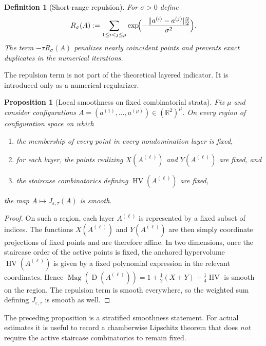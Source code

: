\documentclass{article}
\newtheorem{definition}{Definition}
\newtheorem{proposition}{Proposition}
\newcommand{\Mag}{\operatorname{Mag}}
\newcommand{\HV}{\operatorname{HV}}
\newcommand{\R}{\mathbb{R}}
\newcommand{\front}[1]{A^{(#1)}}
\newcommand{\Dom}{\operatorname{D}}
\begin{document}
\begin{definition}[Short-range repulsion]
For $\sigma>0$ define
\[
R_\sigma(A):=\sum_{1\le i<j\le \mu}\exp\!\Bigl(-\frac{\|a^{(i)}-a^{(j)}\|_2^2}{\sigma^2}\Bigr).
\]
The term $-\tau R_\sigma(A)$ penalizes nearly coincident points and prevents exact duplicates in the numerical iterations.
\end{definition}

The repulsion term is not part of the theoretical layered indicator. It is introduced only as a numerical regularizer.

\begin{proposition}[Local smoothness on fixed combinatorial strata]
Fix $\mu$ and consider configurations $A=(a^{(1)},\dots,a^{(\mu)})\in(\R^2)^\mu$. On every region of configuration space on which
\begin{enumerate}[label=(\roman*)]
\item the membership of every point in every nondomination layer is fixed,
\item for each layer, the points realizing $X(\front{\ell})$ and $Y(\front{\ell})$ are fixed, and
\item the staircase combinatorics defining $\HV(\front{\ell})$ are fixed,
\end{enumerate}
the map $A\mapsto J_{\varepsilon,\tau}(A)$ is smooth.
\end{proposition}

\begin{proof}
On such a region, each layer $\front{\ell}$ is represented by a fixed subset of indices. The functions $X(\front{\ell})$ and $Y(\front{\ell})$ are then simply coordinate projections of fixed points and are therefore affine. In two dimensions, once the staircase order of the active points is fixed, the anchored hypervolume $\HV(\front{\ell})$ is given by a fixed polynomial expression in the relevant coordinates. Hence $\Mag(\Dom(\front{\ell}))=1+\tfrac12(X+Y)+\tfrac14\HV$ is smooth on the region. The repulsion term is smooth everywhere, so the weighted sum defining $J_{\varepsilon,\tau}$ is smooth as well.
\end{proof}

The preceding proposition is a stratified smoothness statement. For actual estimates it is useful to record a chamberwise Lipschitz theorem that does \emph{not} require the active staircase combinatorics to remain fixed.
\end{document}
